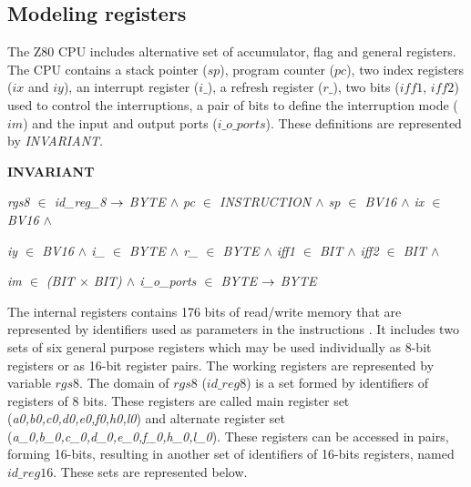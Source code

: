 \documentclass[a4paper]{llncs}
\begin{document}
\subsection{Modeling registers}

The Z80 CPU includes alternative set of accumulator, flag and general registers.
The CPU contains a stack pointer ($\textit{sp}$), program counter
($\textit{pc}$), two index registers ($\textit{ix}$ and $\textit{iy}$), an
interrupt register ($\textit{i\_}$), a refresh register ($\textit{r\_}$), two
bits ($\textit{iff1}$, $\textit{iff2}$) used to control the interruptions, a
pair of bits to define the interruption mode ($\textit{im}$) and the input and
output ports ($\textit{i\_o\_ports}$). These definitions are represented by
\textit{INVARIANT}.
  

\begin{sloppypar}
\bf INVARIANT

\hspace*{0.10in}\it rgs8  $\in$  \it id\_reg\_8  $\rightarrow$  \it BYTE  $\land$ \it pc  $\in$  \it INSTRUCTION  $\land$  \it sp  $\in$  \it BV16 $\land$  \it ix  $\in$  \it BV16  $\land$

\hspace*{0.10in}\it iy  $\in$  \it BV16  $\land$ \it i\_  $\in$  \it BYTE  $\land$  \it r\_ $\in$  \it BYTE  $\land$ \it iff1  $\in$  \it BIT  $\land$ \it iff2  $\in$  \it BIT  $\land$ 

\hspace*{0.10in}\it im $\in$ (\it BIT $\times$ \it BIT\rm )  $\land$  \it i\_o\_ports  $\in$  \it BYTE  $\rightarrow$  \it BYTE
\end{sloppypar}


 

The internal registers contains 176 bits of read/write memory that are
represented by identifiers used as parameters in the instructions . It includes
two sets of six general purpose registers which may be used individually as
8-bit registers or as 16-bit register pairs.  The working registers are
represented by variable $\textit{rgs8}$. The domain of $\textit{rgs8}$
($\textit{id\_reg8}$) is a set formed by identifiers of registers of 8 bits.
These registers are called main register set (\textit{a0,b0,c0,d0,e0,f0,h0,l0})
and alternate register set (\textit{a\_0,b\_0,c\_0,d\_0,e\_0,f\_0,h\_0,l\_0}).
These registers can be accessed in pairs, forming 16-bits, resulting in another
set of identifiers of 16-bits registers, named $\textit{id\_reg16}$. These sets
are represented below.
\end{document}
